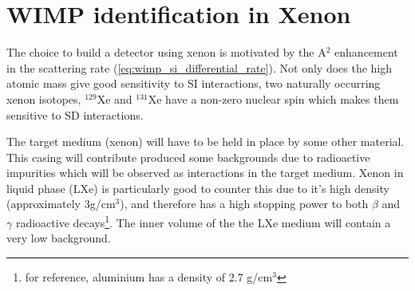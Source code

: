 \section{WIMP identification in Xenon}
\label{sec:wimps_with_xenon}

\par
The choice to build a detector using xenon is motivated by the A$^2$ enhancement in the scattering rate (\autoref{eq:wimp_si_differential_rate}).
Not only does the high atomic mass give good sensitivity to SI interactions, two naturally occurring xenon isotopes, ${}^{129}$Xe and ${}^{131}$Xe have a non-zero nuclear spin which makes them sensitive to SD interactions.
\par
The target medium (xenon) will have to be held in place by some other material.
This casing will contribute produced some backgrounds due to radioactive impurities which will be observed as interactions in the target medium.
Xenon in liquid phase (LXe) is particularly good to counter this due to it's high density (approximately 3g/cm${}^{3}$), and therefore has a high stopping power to both $\beta$ and $\gamma$ radioactive decays\footnote{for reference, aluminium has a density of 2.7 g/cm${}^{3}$}.
The inner volume of the the LXe medium will contain a very low background.



